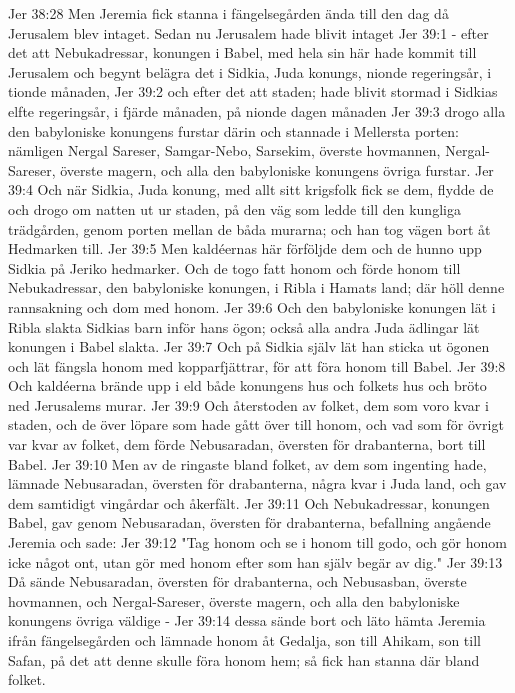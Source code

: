 Jer 38:28  Men Jeremia fick stanna i fängelsegården ända till den dag då Jerusalem blev intaget. Sedan nu Jerusalem hade blivit intaget
Jer 39:1  - efter det att Nebukadressar, konungen i Babel, med hela sin här hade kommit till Jerusalem och begynt belägra det i Sidkia, Juda konungs, nionde regeringsår, i tionde månaden,
Jer 39:2  och efter det att staden; hade blivit stormad i Sidkias elfte regeringsår, i fjärde månaden, på nionde dagen månaden
Jer 39:3  drogo alla den babyloniske konungens furstar därin och stannade i Mellersta porten: nämligen Nergal Sareser, Samgar-Nebo, Sarsekim, överste hovmannen, Nergal-Sareser, överste magern, och alla den babyloniske konungens övriga furstar.
Jer 39:4  Och när Sidkia, Juda konung, med allt sitt krigsfolk fick se dem, flydde de och drogo om natten ut ur staden, på den väg som ledde till den kungliga trädgården, genom porten mellan de båda murarna; och han tog vägen bort åt Hedmarken till.
Jer 39:5  Men kaldéernas här förföljde dem och de hunno upp Sidkia på Jeriko hedmarker. Och de togo fatt honom och förde honom till Nebukadressar, den babyloniske konungen, i Ribla i Hamats land; där höll denne rannsakning och dom med honom.
Jer 39:6  Och den babyloniske konungen lät i Ribla slakta Sidkias barn inför hans ögon; också alla andra Juda ädlingar lät konungen i Babel slakta.
Jer 39:7  Och på Sidkia själv lät han sticka ut ögonen och lät fängsla honom med kopparfjättrar, för att föra honom till Babel.
Jer 39:8  Och kaldéerna brände upp i eld både konungens hus och folkets hus och bröto ned Jerusalems murar.
Jer 39:9  Och återstoden av folket, dem som voro kvar i staden, och de över löpare som hade gått över till honom, och vad som för övrigt var kvar av folket, dem förde Nebusaradan, översten för drabanterna, bort till Babel.
Jer 39:10  Men av de ringaste bland folket, av dem som ingenting hade, lämnade Nebusaradan, översten för drabanterna, några kvar i Juda land, och gav dem samtidigt vingårdar och åkerfält.
Jer 39:11  Och Nebukadressar, konungen Babel, gav genom Nebusaradan, översten för drabanterna, befallning angående Jeremia och sade:
Jer 39:12  "Tag honom och se i honom till godo, och gör honom icke något ont, utan gör med honom efter som han själv begär av dig."
Jer 39:13  Då sände Nebusaradan, översten för drabanterna, och Nebusasban, överste hovmannen, och Nergal-Sareser, överste magern, och alla den babyloniske konungens övriga väldige -
Jer 39:14  dessa sände bort och läto hämta Jeremia ifrån fängelsegården och lämnade honom åt Gedalja, son till Ahikam, son till Safan, på det att denne skulle föra honom hem; så fick han stanna där bland folket.
